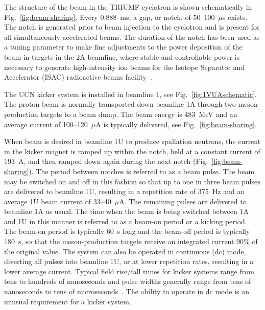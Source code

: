 \documentclass[aps,prab,twocolumn,superscriptaddress]{revtex4-1}
\begin{document}
The structure of the beam in the TRIUMF cyclotron is shown
schematically in Fig.~\ref{fig:beam-sharing}.  Every 0.888~ms, a gap, or
notch, of 50--100~$\mu$s exists.  The notch is generated prior to beam
injection to the cyclotron and is present for all simultaneously
accelerated beams.  The duration of the notch has been used as a
tuning parameter to make fine adjustments to the power deposition of the beam in
targets in the 2A beamline, where stable and controllable power is
necessary to generate high-intensity ion beams for the Isotope
Separator and Accelerator (ISAC) radioactive beams facility~\cite{ISACandARIEL}.

The UCN kicker system is installed in beamline 1, see Fig.~\ref{fig:1VUAschematic}. The proton beam is normally transported down beamline 1A through
two meson-production targets to a beam dump.  
The beam energy is
483~MeV and an average current of 100--120~$\mu$A is typically delivered, see Fig.~\ref{fig:beam-sharing}. 

When beam is desired in beamline 1U to produce spallation neutrons, the current in the
kicker magnet is ramped up within the notch, held at a
constant current of 193~A, and then ramped down again during the next notch (Fig.~\ref{fig:beam-sharing}). The period between notches is referred to as a beam pulse. The beam may be switched on and off in this fashion so that up to one in three beam pulses
are delivered to beamline 1U, resulting in a repetition rate of 375~Hz and an average 1U beam current of 33--40~$\mu$A. 
The remaining pulses are delivered to beamline 1A as usual. The time when the beam is being switched between 1A and 1U in this manner is referred to as a beam-on period or a kicking period.  
The beam-on period is typically 60~s long and the beam-off period is typically 180~s, so that the meson-production targets receive an integrated current 90\% of the original value.
The system
can also be operated in continuous (dc) mode, diverting all pulses into beamline 1U, or at lower repetition rates, resulting in a lower average current. Typical field rise/fall times for kicker systems range from tens to hundreds of nanoseconds and pulse widths generally 
range from tens of nanoseconds to tens of microseconds~\cite{Barnes:CAS2017}. The ability to operate in dc mode is an unusual requirement for a kicker system. 
\end{document}
